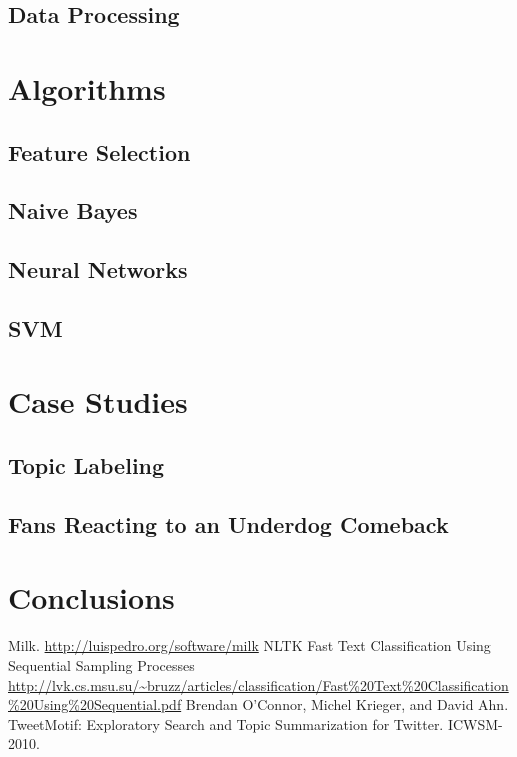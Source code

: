 \documentclass[fontsize=10pt,twocolumn,letterpaper,abstracton]{scrartcl}
\begin{document}
\subsection{Data Processing}

\section{Algorithms}
\subsection{Feature Selection}
\subsection{Naive Bayes}
\subsection{Neural Networks}
\subsection{SVM}

\section{Case Studies}

\subsection{Topic Labeling}

\subsection{Fans Reacting to an Underdog Comeback}

\section{Conclusions}

\begin{thebibliography}{1}

 Milk. \url{http://luispedro.org/software/milk}
 NLTK
 Fast Text Classiﬁcation Using Sequential Sampling Processes \url{http://lvk.cs.msu.su/~bruzz/articles/classification/Fast%20Text%20Classification%20Using%20Sequential.pdf}
 Brendan O'Connor, Michel Krieger, and David Ahn. TweetMotif: Exploratory Search and Topic Summarization for Twitter. ICWSM-2010.

\end{thebibliography}
\end{document}
